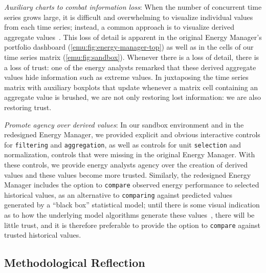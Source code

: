 {\it Auxiliary charts to combat information loss}: When the number of concurrent time series grows large, it is difficult and overwhelming to visualize individual values from each time series; instead, a common approach is to visualize derived aggregate values~\cite{McLachlan2008}.
This loss of detail is apparent in the original Energy Manager's portfolio dashboard (\autoref{emu:fig:energy-manager-top}) as well as in the cells of our time series matrix (\autoref{emu:fig:sandbox}).
Whenever there is a loss of detail, there is a loss of trust: one of the energy analysts remarked that these derived aggregate values hide information such as extreme values.
In juxtaposing the time series matrix with auxiliary boxplots that update whenever a matrix cell containing an aggregate value is brushed, we are not only restoring lost information: we are also restoring trust.

{\it Promote agency over derived values}: In our sandbox environment and in the redesigned Energy Manager, we provided explicit and obvious interactive controls for {\tt filtering} and {\tt aggregation}, as well as controls for unit {\tt selection} and normalization, controls that were missing in the original Energy Manager.
With these controls, we provide energy analysts agency over the creation of derived values and these values become more trusted.
Similarly, the redesigned Energy Manager includes the option to {\tt compare} observed energy performance to selected historical values, as an alternative to {\tt comparing} against predicted values generated by a ``black box'' statistical model; until there is some visual indication as to how the underlying model algorithms generate these values~\cite{Muhlbacher2014}, there will be little trust, and it is therefore preferable to provide the option to {\tt compare} against trusted historical values.


\subsection{Methodological Reflection}
\label{emu:discussion-methodology}

